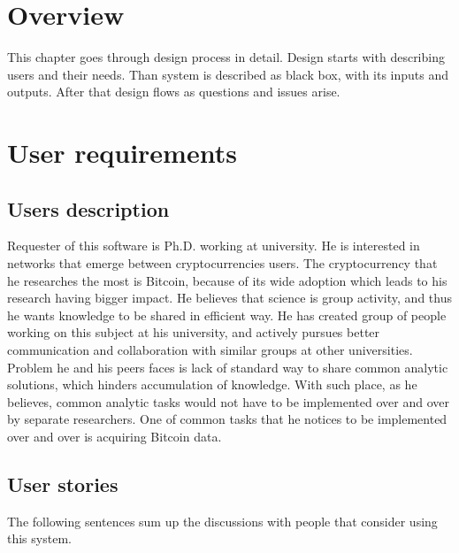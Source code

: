 \documentclass[12pt, en, eng, oneside, final]{mgr}
\begin{document}
\section{Overview}
This chapter goes through design process in detail. Design starts with describing users and their needs. Than system is described as black box, with its inputs and outputs. After that design flows as questions and issues arise. 

\section{User requirements}

\subsection{Users description}

Requester of this software is Ph.D. working at university. He is interested in networks that emerge between cryptocurrencies users. The cryptocurrency that he researches the most is Bitcoin, because of its wide adoption which leads to his research having bigger impact. He believes that science is group activity, and thus he wants knowledge to be shared in efficient way. He has created group of people working on this subject at his university, and actively pursues better communication and collaboration with similar groups at other universities. Problem he and his peers faces is lack of standard way to share common analytic solutions, which hinders accumulation of knowledge. With such place, as he believes, common analytic tasks would not have to be implemented over and over by separate researchers. One of common tasks that he notices to be implemented over and over is acquiring Bitcoin data.  

\subsection{User stories}

The following sentences sum up the discussions with people that consider using this system.
\end{document}
